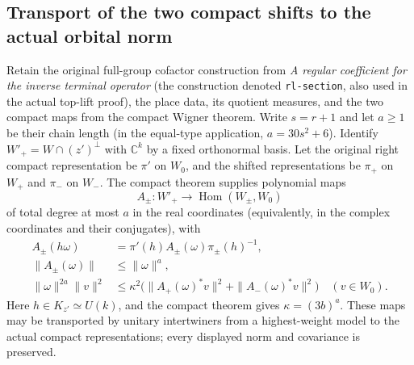 \subsection{Transport of the two compact shifts to the actual orbital norm}
\label{actual-wigner-orbital-transport}

Retain the original full-group cofactor construction from
\emph{A regular coefficient for the inverse terminal operator}
(the construction denoted \texttt{rl-section}, also used in
the actual top-lift proof), the place data, its quotient measures,
and the two compact maps from the compact Wigner theorem.
Write $s=r+1$ and let $a\ge1$ be their
chain length (in the equal-type application, $a=30s^2+6$).
Identify $W'_+=W\cap(z')^\perp$ with $\mathbb C^k$ by a fixed
orthonormal basis.  Let the original right compact representation
be $\pi'$ on $W_0$, and the shifted representations be $\pi_+$
on $W_+$ and $\pi_-$ on $W_-$.  The compact theorem supplies
polynomial maps
\[
 A_\pm:W'_+\longrightarrow\operatorname{Hom}(W_\pm,W_0)
\]
of total degree at most $a$ in the real coordinates (equivalently,
in the complex coordinates and their conjugates), with
\begin{align}
 A_\pm(h\omega)&=\pi'(h)A_\pm(\omega)\pi_\pm(h)^{-1},
                                                        \label{wigner-transport-cov}\\
 \|A_\pm(\omega)\|&\le\|\omega\|^a,\label{wigner-transport-upper}\\
 \|\omega\|^{2a}\|v\|^2
 &\le\kappa^2\bigl(\|A_+(\omega)^*v\|^2
                         +\|A_-(\omega)^*v\|^2\bigr)
 \quad(v\in W_0).                                      \label{wigner-transport-lower}
\end{align}
Here $h\in K_{z'}\simeq U(k)$, and the compact theorem gives
$\kappa=(3b)^a$.  These maps may be transported by unitary
intertwiners from a highest-weight model to the actual compact
representations; every displayed norm and covariance is preserved.

